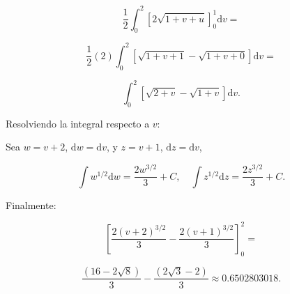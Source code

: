 \[
\frac{1}{2} \int_0^2 \left[ 2\sqrt{1+v+u} \right]_0^1 \mathrm{d}v =
\]

\[
\frac{1}{2} (2) \int_0^2 \left[ \sqrt{1+v+1} - \sqrt{1+v+0} \right] \mathrm{d}v =
\]

\[
\int_0^2 \left[ \sqrt{2+v} - \sqrt{1+v} \right] \mathrm{d}v.
\]

Resolviendo la integral respecto a \(v\):

Sea \(w = v+2\), \(\mathrm{d}w = \mathrm{d}v\), y \(z = v+1\), \(\mathrm{d}z = \mathrm{d}v\),

\[
\int w^{1/2} \mathrm{d}w = \frac{2w^{3/2}}{3} + C, \quad 
\int z^{1/2} \mathrm{d}z = \frac{2z^{3/2}}{3} + C.
\]

Finalmente:

\[
\left[ \frac{2(v+2)^{3/2}}{3} - \frac{2(v+1)^{3/2}}{3} \right]_0^2 =
\]

\[
\frac{(16 - 2\sqrt{8})}{3} - \frac{(2\sqrt{3} - 2)}{3} \approx 0.6502803018.
\]
